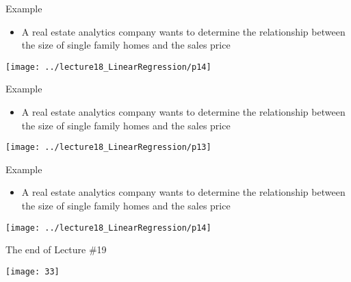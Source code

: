 \documentclass[xcolor=dvipsnames]{beamer}
\begin{document}
\begin{frame}{Example}
	\begin{itemize}
		\item A real estate analytics company wants to determine the relationship between the size of single family homes and the sales price
	\end{itemize}
	\begin{center}
		\texttt{[image: ../lecture18\_LinearRegression/p14]}
	\end{center}
\end{frame}

\begin{frame}{Example}
	\begin{itemize}
		\item A real estate analytics company wants to determine the relationship between the size of single family homes and the sales price
	\end{itemize}
	\begin{center}
		\texttt{[image: ../lecture18\_LinearRegression/p13]}
	\end{center}
\end{frame}

\begin{frame}{Example}
	\begin{itemize}
		\item A real estate analytics company wants to determine the relationship between the size of single family homes and the sales price
	\end{itemize}
	\begin{center}
		\texttt{[image: ../lecture18\_LinearRegression/p14]}
	\end{center}
\end{frame}

\begin{frame}{The end of Lecture \#19}
	\begin{center}
		\texttt{[image: 33]}
	\end{center}
\end{frame}
\end{document}
